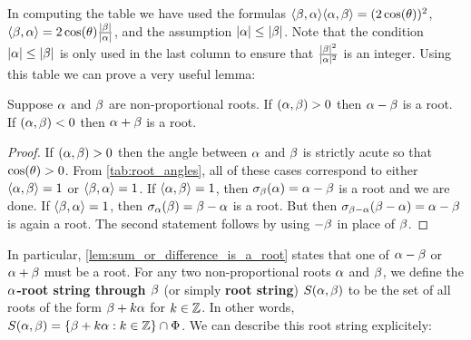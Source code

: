 \documentclass[12pt,reqno,oneside]{amsart}
\begin{document}
    In computing the table we have used the formulas $\langle\beta,\alpha\rangle\langle\alpha,\beta\rangle = (2\cos(\theta))^{2}$, $\langle\beta,\alpha\rangle = 2\cos(\theta)\frac{|\beta|}{|\alpha|}$, and the assumption $|\alpha| \le |\beta|$. Note that the condition $|\alpha| \le |\beta|$ is only used in the last column to ensure that $\frac{|\beta|^{2}}{|\alpha|^{2}}$ is an integer. Using this table we can prove a very useful lemma:

    \begin{lemma}\label{lem:sum_or_difference_is_a_root}
        Suppose $\alpha$ and $\beta$ are non-proportional roots. If $(\alpha,\beta) > 0$ then $\alpha-\beta$ is a root. If $(\alpha,\beta) < 0$ then $\alpha+\beta$ is a root.
    \end{lemma}
    \begin{proof}
        If $(\alpha,\beta) > 0$ then the angle between $\alpha$ and $\beta$ is strictly acute so that $\cos(\theta) > 0$. From \cref{tab:root_angles}, all of these cases correspond to either $\langle\alpha,\beta\rangle = 1$ or $\langle\beta,\alpha\rangle = 1$. If $\langle\alpha,\beta\rangle = 1$, then $\sigma_{\beta}(\alpha) = \alpha-\beta$ is a root and we are done. If $\langle\beta,\alpha\rangle = 1$, then $\sigma_{\alpha}(\beta) = \beta-\alpha$ is a root. But then $\sigma_{\beta-\alpha}(\beta-\alpha) = \alpha-\beta$ is again a root. The second statement follows by using $-\beta$ in place of $\beta$.
    \end{proof}

    In particular, \cref{lem:sum_or_difference_is_a_root} states that one of $\alpha-\beta$ or $\alpha+\beta$ must be a root. For any two non-proportional roots $\alpha$ and $\beta$, we define the \textbf{$\alpha$-root string through $\beta$} (or simply \textbf{root string}) $S(\alpha,\beta)$ to be the set of all roots of the form $\beta+k\alpha$ for $k \in \mathbb{Z}$. In other words, $S(\alpha,\beta) = \{\beta+k\alpha:k \in \mathbb{Z}\} \cap \Phi $. We can describe this root string explicitely:
\end{document}
